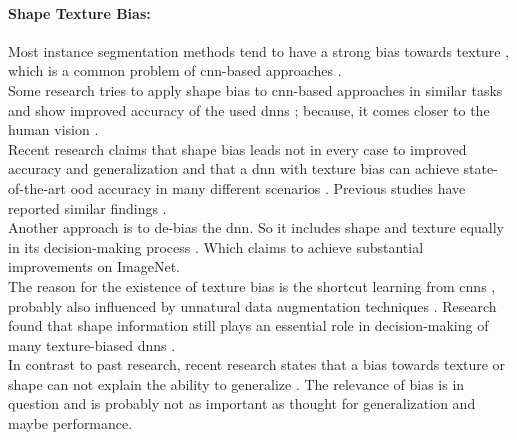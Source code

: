 		\paragraph{Shape Texture Bias:} Most instance segmentation methods tend to have a strong bias towards texture \cite{Theodoridis2022}, which is a common problem of \ac{cnn}-based approaches \cite{Geirhos2022}\cite{Baker2018}\cite{Tabak2023}.\\
		Some research tries to apply shape bias to \ac{cnn}-based approaches in similar tasks and show improved accuracy of the used \ac{dnn}s \cite{Geirhos2022}\cite{Hermann2020}; because, it comes closer to the human vision \cite{Geirhos2020}\cite{Mohla2022}\cite{Baker2020}.\\
		Recent research claims that shape bias leads not in every case to improved accuracy and generalization and that a \ac{dnn} with texture bias can achieve state-of-the-art \ac{ood} accuracy in many different scenarios \cite{Qiu2024}. Previous studies have reported similar findings \cite{Brochu2019}.\\
		Another approach is to de-bias the \ac{dnn}. So it includes shape and texture equally in its decision-making process \cite{Li2021}\cite{Co2021}\cite{Chung2023}. Which claims to achieve substantial improvements on ImageNet. \\
		The reason for the existence of texture bias is the shortcut learning from \ac{cnn}s \cite{Geirhos2020}, probably also influenced by unnatural data augmentation techniques \cite{Hermann2020}. Research found that shape information still plays an essential role in decision-making of many texture-biased \ac{dnn}s \cite{Tabak2023}.\\
		In contrast to past research, recent research states that a bias towards texture or shape can not explain the ability to generalize \cite{Gavrikov2024}. The relevance of bias is in question and is probably not as important as thought for generalization and maybe performance. %
